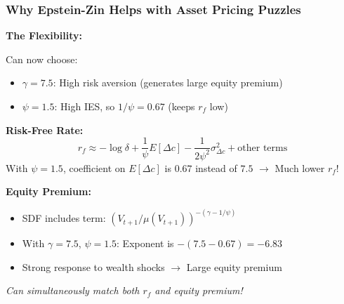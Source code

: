 \documentclass{beamer}
\begin{document}
\begin{frame}
    \frametitle{Why Epstein-Zin Helps with Asset Pricing Puzzles}
    
    \textbf{The Flexibility:}
    
    Can now choose:
    \begin{itemize}
        \item $\gamma = 7.5$: High risk aversion (generates large equity premium)
        \item $\psi = 1.5$: High IES, so $1/\psi = 0.67$ (keeps $r_f$ low)
    \end{itemize}
    
    
    \textbf{Risk-Free Rate:}
    \begin{equation*}
        r_f \approx -\log \delta + \frac{1}{\psi} E[\Delta c] - \frac{1}{2\psi^2} \sigma_{\Delta c}^2 + \text{other terms}
    \end{equation*}
    With $\psi = 1.5$, coefficient on $E[\Delta c]$ is $0.67$ instead of $7.5$ $\rightarrow$ Much lower $r_f$!
    
    
    \textbf{Equity Premium:}
    \begin{itemize}
        \item SDF includes term: $(V_{t+1}/\mu(V_{t+1}))^{-(\gamma - 1/\psi)}$
        \item With $\gamma = 7.5$, $\psi = 1.5$: Exponent is $-(7.5 - 0.67) = -6.83$
        \item Strong response to wealth shocks $\rightarrow$ Large equity premium
    \end{itemize}
    
    
    \textit{Can simultaneously match both $r_f$ and equity premium!}
    
\end{frame}
\end{document}
